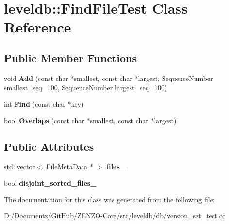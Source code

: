 \hypertarget{classleveldb_1_1_find_file_test}{}\section{leveldb\+::Find\+File\+Test Class Reference}
\label{classleveldb_1_1_find_file_test}
\subsection*{Public Member Functions}
\begin{DoxyCompactItemize}
\item 
\mbox{\label{classleveldb_1_1_find_file_test_a7daf932b5d9881438c6edb5f7881901c}} 
void {\bfseries Add} (const char $\ast$smallest, const char $\ast$largest, Sequence\+Number smallest\+\_\+seq=100, Sequence\+Number largest\+\_\+seq=100)
\item 
\mbox{\label{classleveldb_1_1_find_file_test_a233fd8c1e1764f2572e03d28b1f58ae0}} 
int {\bfseries Find} (const char $\ast$key)
\item 
\mbox{\label{classleveldb_1_1_find_file_test_a617e51dc2e6acbe7d5bc6d0a7224ac51}} 
bool {\bfseries Overlaps} (const char $\ast$smallest, const char $\ast$largest)
\end{DoxyCompactItemize}
\subsection*{Public Attributes}
\begin{DoxyCompactItemize}
\item 
\mbox{\label{classleveldb_1_1_find_file_test_a53b61e6b01283c235fae219013b0e2c7}} 
std\+::vector$<$ \mbox{\hyperlink{structleveldb_1_1_file_meta_data}{File\+Meta\+Data}} $\ast$ $>$ {\bfseries files\+\_\+}
\item 
\mbox{\label{classleveldb_1_1_find_file_test_acf50512be17b9a3cd96388a8c837b8e0}} 
bool {\bfseries disjoint\+\_\+sorted\+\_\+files\+\_\+}
\end{DoxyCompactItemize}


The documentation for this class was generated from the following file\+:\begin{DoxyCompactItemize}
\item 
D\+:/\+Documentz/\+Git\+Hub/\+Z\+E\+N\+Z\+O-\/\+Core/src/leveldb/db/version\+\_\+set\+\_\+test.\+cc\end{DoxyCompactItemize}
